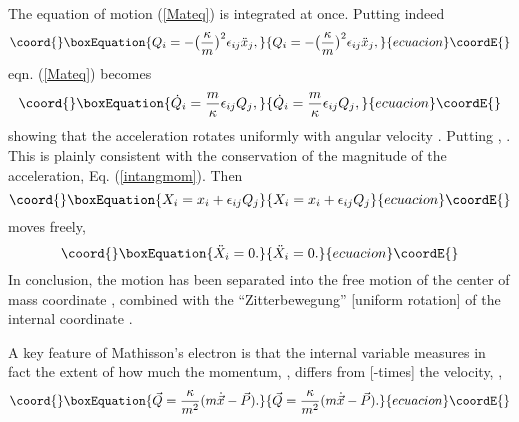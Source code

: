 \documentclass[a4paper,11pt]{article}
\providecommand{\vx}{{\vec x}}
\def\vP{{\vec P}}
\def\vQ{{\vec Q}}
\def\vx{{\vec x}}
\def\vX{{\vec X}}
\begin{document}
The equation of motion (\ref{Mateq}) is integrated at once.
Putting indeed
\begin{equation}\coord{}\boxEquation{
     Q_{i}=
     -\big(\frac{\kappa}{m}\big)^2\epsilon_{ij}\ddot{x}_{j},
     \label{intcoord}
}{
     Q_{i}=
     -\big(\frac{\kappa}{m}\big)^2\epsilon_{ij}\ddot{x}_{j},
     }{ecuacion}\coordE{}\end{equation}
eqn. (\ref{Mateq}) becomes
\begin{equation}\coord{}\boxEquation{
     \dot{Q}_{i}=\frac{m}{\kappa}\epsilon_{ij}Q_{j},
     \label{Qeq}
}{
     \dot{Q}_{i}=\frac{m}{\kappa}\epsilon_{ij}Q_{j},
     }{ecuacion}\coordE{}\end{equation}
showing that  the
acceleration rotates uniformly with angular velocity
\coordHE{}. Putting \coordHE{}, \coordHE{}.
This is plainly consistent with the conservation
of the magnitude of the acceleration, Eq. (\ref{intangmom}). Then
\begin{equation}\coord{}\boxEquation{
     X_{i}=x_{i}+\epsilon_{ij}Q_{j}
     \label{CMcoord}
}{
     X_{i}=x_{i}+\epsilon_{ij}Q_{j}
     }{ecuacion}\coordE{}\end{equation}
moves freely,
\begin{equation}\coord{}\boxEquation{
     \ddot{X}_{i}=0.
     \label{CMmot}
}{
     \ddot{X}_{i}=0.
     }{ecuacion}\coordE{}\end{equation}
In conclusion, the motion has been separated into the
free motion of the center of mass coordinate
\myHighlight{$\vX$}\coordHE{}, combined with the ``Zitterbewegung'' [uniform rotation] of the
internal coordinate \myHighlight{$\vQ$}\coordHE{}.

A key feature of Mathisson's electron is that
  the internal variable
\myHighlight{$\vQ$}\coordHE{} measures in fact the extent of how much
the momentum, \myHighlight{$\vP$}\coordHE{}, differs from [\coordHE{}-times] the velocity, \myHighlight{$\dot{\vx}$}\coordHE{},
\begin{equation}\coord{}\boxEquation{
     \vQ=\frac{\kappa}{m^2}(m\dot{\vx}-\vP).
     \label{velmom}
}{
     \vQ=\frac{\kappa}{m^2}(m\dot{\vx}-\vP).
     }{ecuacion}\coordE{}\end{equation}
\end{document}
